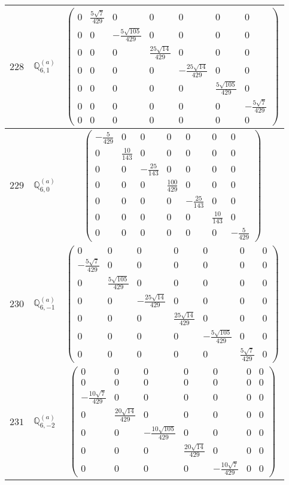 \documentclass[fleqn,8pt,landscape]{jsarticle}
\begin{document}
\begin{center}
\begin{longtable}{ccc}
$ 228 $ & $ \mathbb{Q}_{6,1}^{(a)} $ & $ \begin{pmatrix} 0 & \frac{5 \sqrt{7}}{429} & 0 & 0 & 0 & 0 & 0 \\ 0 & 0 & - \frac{5 \sqrt{105}}{429} & 0 & 0 & 0 & 0 \\ 0 & 0 & 0 & \frac{25 \sqrt{14}}{429} & 0 & 0 & 0 \\ 0 & 0 & 0 & 0 & - \frac{25 \sqrt{14}}{429} & 0 & 0 \\ 0 & 0 & 0 & 0 & 0 & \frac{5 \sqrt{105}}{429} & 0 \\ 0 & 0 & 0 & 0 & 0 & 0 & - \frac{5 \sqrt{7}}{429} \\ 0 & 0 & 0 & 0 & 0 & 0 & 0 \end{pmatrix} $ \\ \hline
$ 229 $ & $ \mathbb{Q}_{6,0}^{(a)} $ & $ \begin{pmatrix} - \frac{5}{429} & 0 & 0 & 0 & 0 & 0 & 0 \\ 0 & \frac{10}{143} & 0 & 0 & 0 & 0 & 0 \\ 0 & 0 & - \frac{25}{143} & 0 & 0 & 0 & 0 \\ 0 & 0 & 0 & \frac{100}{429} & 0 & 0 & 0 \\ 0 & 0 & 0 & 0 & - \frac{25}{143} & 0 & 0 \\ 0 & 0 & 0 & 0 & 0 & \frac{10}{143} & 0 \\ 0 & 0 & 0 & 0 & 0 & 0 & - \frac{5}{429} \end{pmatrix} $ \\ \hline
$ 230 $ & $ \mathbb{Q}_{6,-1}^{(a)} $ & $ \begin{pmatrix} 0 & 0 & 0 & 0 & 0 & 0 & 0 \\ - \frac{5 \sqrt{7}}{429} & 0 & 0 & 0 & 0 & 0 & 0 \\ 0 & \frac{5 \sqrt{105}}{429} & 0 & 0 & 0 & 0 & 0 \\ 0 & 0 & - \frac{25 \sqrt{14}}{429} & 0 & 0 & 0 & 0 \\ 0 & 0 & 0 & \frac{25 \sqrt{14}}{429} & 0 & 0 & 0 \\ 0 & 0 & 0 & 0 & - \frac{5 \sqrt{105}}{429} & 0 & 0 \\ 0 & 0 & 0 & 0 & 0 & \frac{5 \sqrt{7}}{429} & 0 \end{pmatrix} $ \\ \hline
$ 231 $ & $ \mathbb{Q}_{6,-2}^{(a)} $ & $ \begin{pmatrix} 0 & 0 & 0 & 0 & 0 & 0 & 0 \\ 0 & 0 & 0 & 0 & 0 & 0 & 0 \\ - \frac{10 \sqrt{7}}{429} & 0 & 0 & 0 & 0 & 0 & 0 \\ 0 & \frac{20 \sqrt{14}}{429} & 0 & 0 & 0 & 0 & 0 \\ 0 & 0 & - \frac{10 \sqrt{105}}{429} & 0 & 0 & 0 & 0 \\ 0 & 0 & 0 & \frac{20 \sqrt{14}}{429} & 0 & 0 & 0 \\ 0 & 0 & 0 & 0 & - \frac{10 \sqrt{7}}{429} & 0 & 0 \end{pmatrix} $ \\ \hline

\end{longtable}
\end{center}
\end{document}
